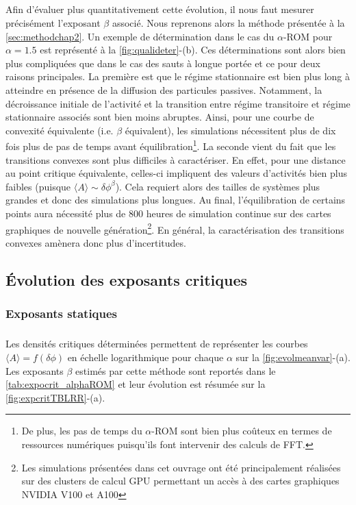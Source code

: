 \subparagraph{}Afin d'évaluer plus quantitativement cette évolution, il nous faut mesurer précisément l'exposant $\beta$ associé. Nous reprenons alors la méthode présentée à la \autoref{sec:methodchap2}. Un exemple de détermination dans le cas du $\alpha$-ROM pour $\alpha = 1.5$ est représenté à la \autoref{fig:qualideter}-(b). Ces déterminations sont alors bien plus compliquées que dans le cas des sauts à longue portée et ce pour deux raisons principales. La première est que le régime stationnaire est bien plus long à atteindre en présence de la diffusion des particules passives. Notamment, la décroissance initiale de l'activité et la transition entre régime transitoire et régime stationnaire associés sont bien moins abruptes. Ainsi, pour une courbe de convexité équivalente (i.e. $\beta$ équivalent), les simulations nécessitent plus de dix fois plus de pas de temps avant équilibration\footnote{De plus, les pas de temps du $\alpha$-ROM sont bien plus coûteux en termes de ressources numériques puisqu'ils font intervenir des calculs de FFT.}. La seconde vient du fait que les transitions convexes sont plus difficiles à caractériser. En effet, pour une distance au point critique équivalente, celles-ci impliquent des valeurs d'activités bien plus faibles (puisque $\langle A \rangle \sim \delta\phi^\beta$). Cela requiert alors des tailles de systèmes plus grandes et donc des simulations plus longues. Au final, l'équilibration de certains points aura nécessité plus de 800 heures de simulation continue sur des cartes graphiques de nouvelle génération\footnote{Les simulations présentées dans cet ouvrage ont été principalement réalisées sur des clusters de calcul GPU permettant un accès à des cartes graphiques NVIDIA V100 et A100}. En général, la caractérisation des transitions convexes amènera donc plus d'incertitudes.

\subsection{Évolution des exposants critiques}

\subsubsection{Exposants statiques}

\label{sec:TBLRRStat}

\subparagraph{}Les densités critiques déterminées permettent de représenter les courbes $\langle A \rangle = f(\delta\phi)$ en échelle logarithmique pour chaque $\alpha$ sur la \autoref{fig:evolmeanvar}-(a). Les exposants $\beta$ estimés par cette méthode sont reportés dans le \autoref{tab:expocrit_alphaROM} et leur évolution est résumée sur la \autoref{fig:expcritTBLRR}-(a).

